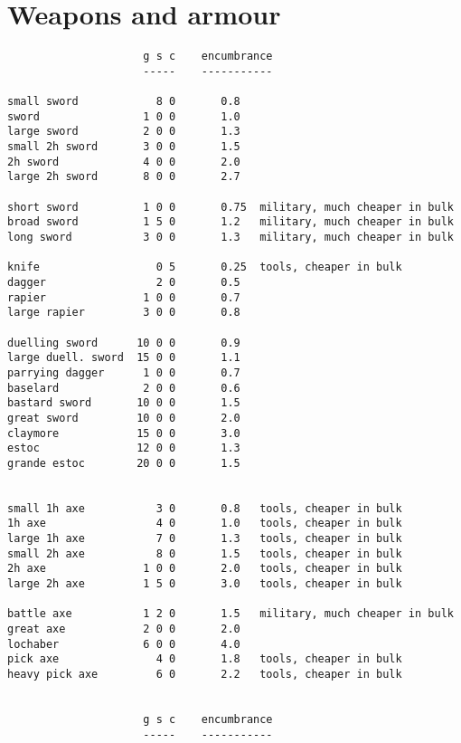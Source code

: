 
\goodbreak {}
\section*{Weapons and armour}


\small
\begin{verbatim}
                     g s c    encumbrance
                     -----    -----------

small sword            8 0       0.8
sword                1 0 0       1.0
large sword          2 0 0       1.3
small 2h sword       3 0 0       1.5
2h sword             4 0 0       2.0
large 2h sword       8 0 0       2.7

short sword          1 0 0       0.75  military, much cheaper in bulk
broad sword          1 5 0       1.2   military, much cheaper in bulk
long sword           3 0 0       1.3   military, much cheaper in bulk

knife                  0 5       0.25  tools, cheaper in bulk
dagger                 2 0       0.5
rapier               1 0 0       0.7
large rapier         3 0 0       0.8

duelling sword      10 0 0       0.9
large duell. sword  15 0 0       1.1
parrying dagger      1 0 0       0.7
baselard             2 0 0       0.6
bastard sword       10 0 0       1.5
great sword         10 0 0       2.0
claymore            15 0 0       3.0
estoc               12 0 0       1.3
grande estoc        20 0 0       1.5


small 1h axe           3 0       0.8   tools, cheaper in bulk
1h axe                 4 0       1.0   tools, cheaper in bulk
large 1h axe           7 0       1.3   tools, cheaper in bulk
small 2h axe           8 0       1.5   tools, cheaper in bulk
2h axe               1 0 0       2.0   tools, cheaper in bulk
large 2h axe         1 5 0       3.0   tools, cheaper in bulk

battle axe           1 2 0       1.5   military, much cheaper in bulk
great axe            2 0 0       2.0
lochaber             6 0 0       4.0
pick axe               4 0       1.8   tools, cheaper in bulk
heavy pick axe         6 0       2.2   tools, cheaper in bulk


                     g s c    encumbrance
                     -----    -----------


\end{verbatim}
